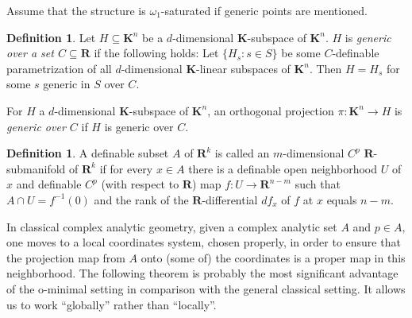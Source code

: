 \documentclass{amsart}
\theoremstyle{definition}
\newtheorem{definition}[theorem]{Definition}
\numberwithin{equation}{section}
\begin{document}
Assume that the structure is $\omega_1$-saturated if generic points are mentioned.

\begin{definition}
	Let $H \subseteq \mathbf{K}^n$ be a $d$-dimensional $\mathbf{K}$-subspace of $\mathbf{K}^n$.
	$H$ is \emph{generic over a set $C \subseteq \mathbf{R}$} if the following holds:
	Let $\{H_s: s \in S\}$ be some $C$-definable parametrization of all $d$-dimensional $\mathbf{K}$-linear subspaces of $\mathbf{K}^n$.
	Then $H = H_s$ for some $s$ generic in $S$ over $C$.
\end{definition}

For $H$ a $d$-dimensional $\mathbf{K}$-subspace of $\mathbf{K}^n$,
an orthogonal projection $\pi:\mathbf{K}^n \to H$ is \emph{generic over $C$} if $H$ is generic over $C$.

\begin{definition}
	A definable subset $A$ of $\mathbf{R}^k$ is called an $m$-dimensional $C^p$ $\mathbf{R}$-submanifold of $\mathbf{R}^k$
	if for every $x\in A$ there is a definable open neighborhood $U$ of $x$ and definable $C^p$ (with respect to $\mathbf{R}$) map
	$f: U \to \mathbf{R}^{n-m}$ such that $A \cap U = f^{-1}(0)$ and the rank of the $\mathbf{R}$-differential $df_x$ of $f$ at $x$ equals $n-m$.
\end{definition}

In classical complex analytic geometry,
given a complex analytic set $A$ and $p \in A$,
one moves to a local coordinates system,
chosen properly, in order to ensure that the projection map from $A$ onto (some of) the coordinates is a proper map in this neighborhood.
The following theorem is probably the most significant advantage of the o-minimal setting in comparison with the general classical setting.
It allows us to work “globally” rather than “locally”.
\end{document}

